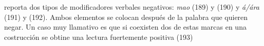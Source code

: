 \textcolor{MidnightBlue}{\citet{wari}} reporta dos tipos de modificadores verbales negativos: {\setmainfont{Charis SIL} \textit{mao}} (189) y (190) y {\setmainfont{Charis SIL} \textit{á/ára}} (191) y (192). Ambos elementos se colocan después de la palabra que quieren negar. Un caso muy llamativo es que si coexisten dos de estas marcas en una costrucción se obtine una lectura fuertemente positiva (193)